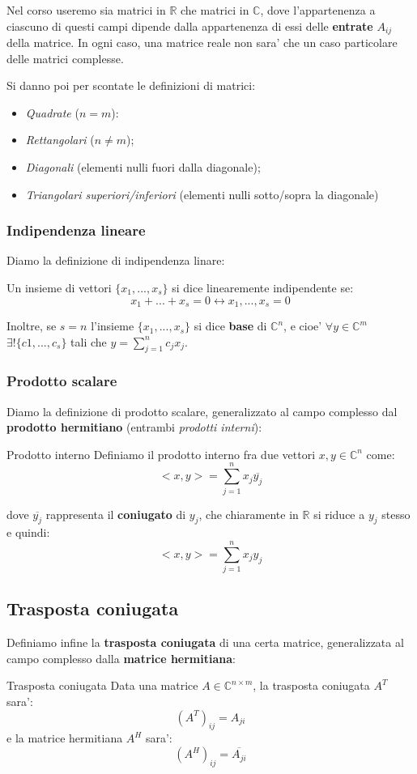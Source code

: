 \documentclass[a4paper,11pt]{article}
\begin{document}
Nel corso useremo sia matrici in $\mathbb{R}$ che matrici in $\mathbb{C}$, dove l'appartenenza a ciascuno di questi campi dipende dalla appartenenza di essi delle \textbf{entrate} $A_{ij}$ della matrice.
In ogni caso, una matrice reale non sara' che un caso particolare delle matrici complesse.

Si danno poi per scontate le definizioni di matrici:
\begin{itemize}
	\item \textit{Quadrate} ($n = m$):
	\item \textit{Rettangolari} ($n \neq m$);
	\item \textit{Diagonali} (elementi nulli fuori dalla diagonale);
	\item \textit{Triangolari superiori/inferiori} (elementi nulli sotto/sopra la diagonale) 
\end{itemize}

\subsubsection{Indipendenza lineare}
Diamo la definizione di indipendenza linare:
\begin{definition}{}
	Un insieme di vettori $\{x_1, ..., x_s\}$ si dice linearemente indipendente se:
	$$
		x_1 + ... + x_s = 0 \leftrightarrow x_1, ..., x_s = 0
	$$
\end{definition}

Inoltre, se $s = n$ l'insieme $\{ x_1, ...,x_s \}$ si dice \textbf{base} di $\mathbb{C}^n$, e cioe' $\forall y \in \mathbb{C}^m$ $\exists ! \{c1, ..., c_s\}$ tali che $y = \sum_{j=1}^n c_j x_j$.

\subsubsection{Prodotto scalare}
Diamo la definizione di prodotto scalare, generalizzato al campo complesso dal \textbf{prodotto hermitiano} (entrambi \textit{prodotti interni}):
\begin{definition}{Prodotto interno}
	Definiamo il prodotto interno fra due vettori $x, y \in \mathbb{C}^n$ come:
	$$
	<x, y> = \sum_{j = 1}^n x_j \overline{y_j}
	$$
\end{definition}
dove $\overline{y_j}$ rappresenta il \textbf{coniugato} di $y_j$, che chiaramente in $\mathbb{R}$ si riduce a $y_j$ stesso e quindi:
	$$
	<x, y> = \sum_{j = 1}^n x_j y_j
	$$ 

\subsection{Trasposta coniugata}
Definiamo infine la \textbf{trasposta coniugata} di una certa matrice, generalizzata al campo complesso dalla \textbf{matrice hermitiana}:
\begin{definition}{Trasposta coniugata}
	Data una matrice $A \in \mathbb{C}^{n \times m}$, la trasposta coniugata $A^T$ sara':
	$$
		(A^T)_{ij} = A_{ji}
	$$
	e la matrice hermitiana $A^H$ sara': 
	$$
		(A^H)_{ij} = \overline{A_{ji}}
	$$
\end{definition}
\end{document}
